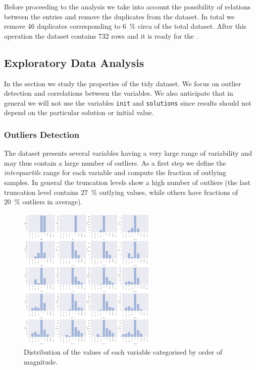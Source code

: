 Before proceeding to the analysis we take into account the possibility of relations between the entries and remove the duplicates from the dataset.
In total we remove 46 duplicates corresponding to \SI{6}{\percent} circa of the total dataset.
After this operation the dataset contains 732 rows and it is ready for the \eda.


\subsection{Exploratory Data Analysis}

In the \eda section we study the properties of the tidy dataset.
We focus on outlier detection and correlations between the variables.
We also anticipate that in general we will not use the variables \texttt{init} and \texttt{solutions} since results should not depend on the particular solution or initial value.


\subsubsection{Outliers Detection}

The dataset presents several variables having a very large range of variability and may thus contain a large number of outliers.
As a first step we define the \emph{interquartile} range for each variable and compute the fraction of outlying samples.\footnotemark{}
In general the truncation levels show a high number of outliers (the last truncation level contains \SI{27}{\percent} outlying values, while others have fractions of \SI{20}{\percent} outliers in average).

\begin{figure}[htbp]
  \centering
  \includegraphics[width=0.6\textwidth]{img/counts_full}
  \caption{Distribution of the values of each variable categorised by order of magnitude.}
  \label{fig:lumps:counts}
\end{figure}

